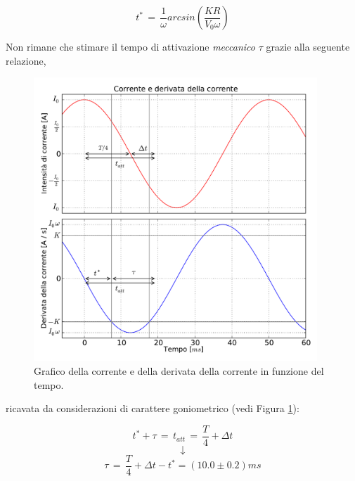 \begin{equation}
t^* \, = \, \frac{1}{\omega}arcsin\left(\frac{K R}{V_0 \omega}\right)
\label{eq:t_star}
\end{equation}

Non rimane che stimare il tempo di attivazione \emph{meccanico} $\tau$ grazie alla seguente relazione,
\begin{figure}
	\centering
    \includegraphics[height=4.2in]{gon.pdf}
    \caption{Grafico della corrente e della derivata della corrente in funzione del tempo.}
    \label{fig:gon}
\end{figure}
ricavata da considerazioni di carattere goniometrico (vedi Figura \ref{fig:gon}):\\

\noindent
\begin{minipage}{0.38\textwidth}
\begin{equation*}
t^* + \tau \,= \, t_{att} \, = \, \frac{T}{4} + \Delta t
\end{equation*}
\begin{equation*}
\downarrow
\end{equation*}
\begin{equation}
\tau \, = \, \frac{T}{4} + \Delta t - t^* = (10.0 \pm 0.2) ms
\label{eq:times}
\end{equation}
\end{minipage}

